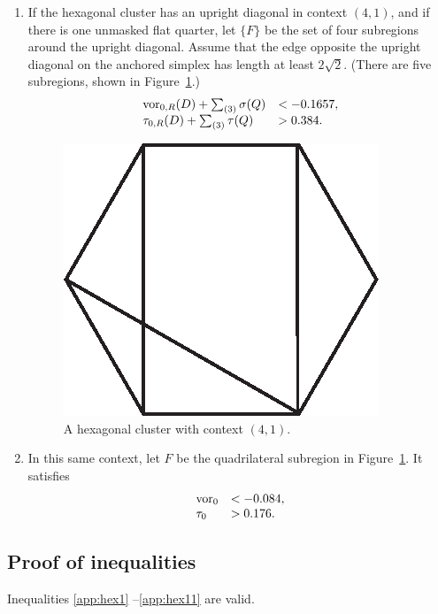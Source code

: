\begin{enumerate}
\item\label{app:hex10} If the hexagonal cluster has an upright
diagonal in context $(4,1)$, and if there is one unmasked flat
quarter, let $\{F\}$ be the set of four subregions around the
upright diagonal. Assume that the edge opposite the upright
diagonal on the anchored simplex has length at least $2\sqrt2$.
 (There are five subregions, shown in Figure~\ref{fig:hex41a}.)
    $$
    \begin{array}{lll}
    \operatorname{vor}_{0,R}(D)+\sum_{(3)}\sigma(Q) &< -0.1657,\\
    \tau_{0,R}(D)+\sum_{(3)}\tau(Q) &> 0.384.
    \end{array}
    $$
\begin{figure}[htb]
  \centering
  \includegraphics{PS/hex41a.eps}
  \caption{A hexagonal cluster with context $(4,1)$.}
  \label{fig:hex41a}
\end{figure}

\item\label{app:hex11} In this same context, let $F$ be the
quadrilateral subregion in Figure~\ref{fig:hex41a}. It satisfies
    $$
    \begin{array}{lll}
    \operatorname{vor}_0 &< -0.084,\\
    \tau_0 &> 0.176.
    \end{array}
    $$


\end{enumerate}


\subsection{Proof of inequalities}
\label{app:hexquad}


\begin{proposition}  Inequalities \ref{app:hex1} --\ref{app:hex11}  are valid.
\end{proposition}

